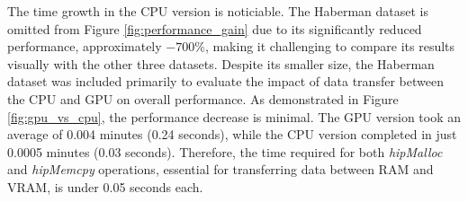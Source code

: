 The time growth in the CPU version is noticiable.
The Haberman dataset is omitted from Figure \ref{fig:performance_gain} due to its significantly reduced performance,
approximately $-700\%$, making it challenging to compare its results visually with the other three datasets.
Despite its smaller size, the Haberman dataset was included primarily to evaluate the impact of data transfer
between the CPU and GPU on overall performance. As demonstrated in Figure \ref{fig:gpu_vs_cpu}, the performance decrease is minimal.
The GPU version took an average of 0.004 minutes (0.24 seconds), while the CPU version completed in just 0.0005 minutes (0.03 seconds).
Therefore, the time required for both \emph{hipMalloc} and \emph{hipMemcpy} operations, essential for transferring data between RAM and VRAM,
is under 0.05 seconds each.
